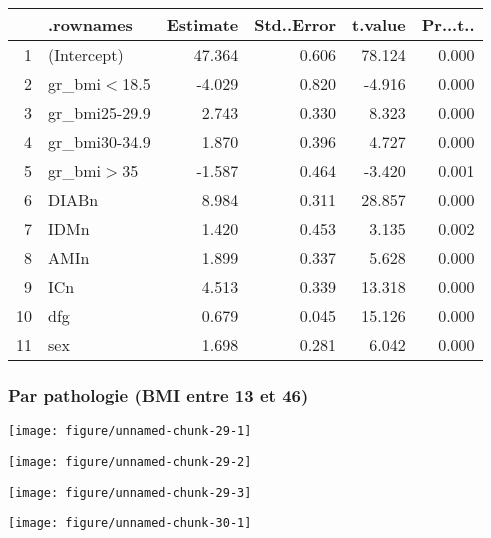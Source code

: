 \documentclass[11pt,a4paper]{article}\usepackage[]{graphicx}\usepackage[]{color}
\makeatletter
\def\maxwidth{ %
  \ifdim\Gin@nat@width>\linewidth
    \linewidth
  \else
    \Gin@nat@width
  \fi
}
\newenvironment{knitrout}{}{} %
\makeatother
\begin{document}
\begin{table}[H]
\centering
\begin{tabular}{rlrrrr}
  \hline
 & .rownames & Estimate & Std..Error & t.value & Pr...t.. \\ 
  \hline
1 & (Intercept) & 47.364 & 0.606 & 78.124 & 0.000 \\ 
  2 & gr\_bmi$<$18.5 & -4.029 & 0.820 & -4.916 & 0.000 \\ 
  3 & gr\_bmi25-29.9 & 2.743 & 0.330 & 8.323 & 0.000 \\ 
  4 & gr\_bmi30-34.9 & 1.870 & 0.396 & 4.727 & 0.000 \\ 
  5 & gr\_bmi$>$35 & -1.587 & 0.464 & -3.420 & 0.001 \\ 
  6 & DIABn & 8.984 & 0.311 & 28.857 & 0.000 \\ 
  7 & IDMn & 1.420 & 0.453 & 3.135 & 0.002 \\ 
  8 & AMIn & 1.899 & 0.337 & 5.628 & 0.000 \\ 
  9 & ICn & 4.513 & 0.339 & 13.318 & 0.000 \\ 
  10 & dfg & 0.679 & 0.045 & 15.126 & 0.000 \\ 
  11 & sex & 1.698 & 0.281 & 6.042 & 0.000 \\ 
   \hline
\end{tabular}
\end{table}


\subsubsection*{Par pathologie (BMI entre 13 et 46)}

\begin{knitrout}
\color{fgcolor}
\texttt{[image: figure/unnamed-chunk-29-1]} 

\texttt{[image: figure/unnamed-chunk-29-2]} 

\texttt{[image: figure/unnamed-chunk-29-3]} 

\end{knitrout}

\begin{knitrout}
\color{fgcolor}
\texttt{[image: figure/unnamed-chunk-30-1]} 

\end{knitrout}
\end{document}
